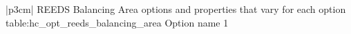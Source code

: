 \begin{customLongTable}{ |p{3cm}| }
{REEDS Balancing Area options and properties that vary for each option} {table:hc_opt_reeds_balancing_area}
{Option name}
1 \\  \\  \\  \\  \\  \\  \\  \\  \\  \\  \\  \\  \\  \\  \\  \\  \\  \\  \\  \\  \\  \\  \\  \\  \\  \\  \\  \\  \\  \\  \\  \\  \\  \\  \\  \\  \\  \\  \\  \\  \\  \\  \\  \\  \\  \\ \hline

\end{customLongTable}
